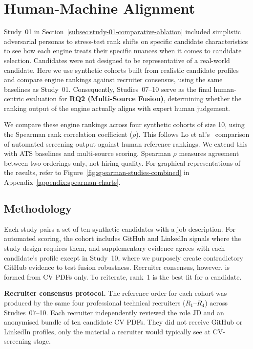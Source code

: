 \section{Human-Machine Alignment}
\label{sec:human-machine-alignment}

Study~01 in Section~\ref{subsec:study-01-comparative-ablation} 
included simplistic adversarial personas to stress-test rank shifts on specific candidate characteristics to see
how each engine treats their specific nuances when it comes to candidate selection. Candidates were not designed to
be representative of a real-world candidate. Here we use synthetic cohorts built from realistic candidate profiles and compare
engine rankings against recruiter consensus, using the same baselines as Study~01. Consequently, Studies~07--10 serve as the final human-centric evaluation for \textbf{RQ2 (Multi-Source Fusion)}, determining whether the ranking output of the engine actually aligns with expert human judgement.

We compare these engine rankings across four synthetic cohorts of size 10, using the Spearman rank correlation coefficient ($\rho$).
This follows Lo et al.'s~\cite{lo2025aihiring} comparison of automated screening output against human reference rankings. We extend
this with ATS baselines and multi-source scoring. Spearman $\rho$ measures agreement between two orderings only, not hiring quality.
For graphical representations of the results, refer to Figure~\ref{fig:spearman-studies-combined} 
in Appendix~\ref{appendix:spearman-charts}.


\subsection{Methodology}
\label{subsec:spearman-method}

Each study pairs a set of ten synthetic candidates with a job description.
For automated scoring, the cohort includes GitHub and LinkedIn signals where the study design requires them, 
and supplementary evidence agrees with each candidate's profile except in Study~10, where we purposely create 
contradictory GitHub evidence to test fusion robustness.
Recruiter consensus, however, is formed from CV PDFs only.
To reiterate, rank~1 is the best fit for a candidate.

\textbf{Recruiter consensus protocol.}
The reference order for each cohort was produced by the same four professional technical recruiters ($R_1$--$R_4$) across Studies~07--10.
Each recruiter independently reviewed the role JD and an anonymised bundle of ten candidate CV PDFs.
They did not receive GitHub or LinkedIn profiles, only the material a recruiter would typically see at CV-screening stage.

